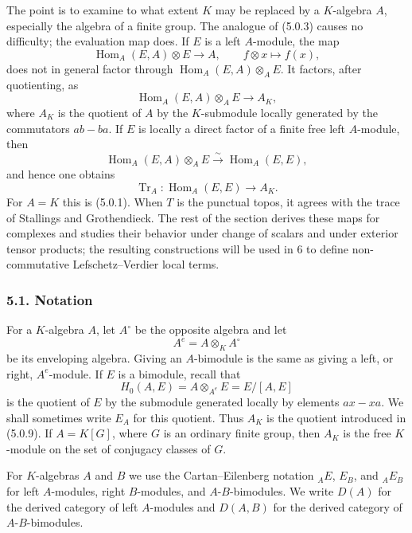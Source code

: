 \documentclass[12pt]{article}
\newcommand{\Hom}{\operatorname{Hom}}
\newcommand{\Tr}{\operatorname{Tr}}
\begin{document}
The point is to examine to what extent $K$ may be replaced by a $K$-algebra $A$, especially the algebra of a finite group. The analogue of (5.0.3) causes no difficulty; the evaluation map does. If $E$ is a left $A$-module, the map
\[
   \Hom_A(E,A)\otimes E\to A,
   \qquad f\otimes x\mapsto f(x),
\]
does not in general factor through $\Hom_A(E,A)\otimes_AE$. It factors, after quotienting, as
\begin{equation}
   \Hom_A(E,A)\otimes_AE\to A_K,                                  \tag{5.0.9}
\end{equation}
where $A_K$ is the quotient of $A$ by the $K$-submodule locally generated by the commutators $ab-ba$. If $E$ is locally a direct factor of a finite free left $A$-module, then
\begin{equation}
   \Hom_A(E,A)\otimes_AE\xrightarrow{\sim}\Hom_A(E,E),              \tag{5.0.10}
\end{equation}
and hence one obtains
\begin{equation}
   \Tr_A:\Hom_A(E,E)\to A_K.                                      \tag{5.0.11}
\end{equation}
For $A=K$ this is (5.0.1). When $T$ is the punctual topos, it agrees with the trace of Stallings and Grothendieck. The rest of the section derives these maps for complexes and studies their behavior under change of scalars and under exterior tensor products; the resulting constructions will be used in 6 to define non-commutative Lefschetz--Verdier local terms.

\subsubsection*{5.1. Notation}
For a $K$-algebra $A$, let $A^{\circ}$ be the opposite algebra and let
\[
   A^e=A\otimes_KA^{\circ}
\]
be its enveloping algebra. Giving an $A$-bimodule is the same as giving a left, or right, $A^e$-module. If $E$ is a bimodule, recall that
\[
   H_0(A,E)=A\otimes_{A^e}E=E/[A,E]
\]
is the quotient of $E$ by the submodule generated locally by elements $ax-xa$. We shall sometimes write $E_A$ for this quotient. Thus $A_K$ is the quotient introduced in (5.0.9). If $A=K[G]$, where $G$ is an ordinary finite group, then $A_K$ is the free $K$-module on the set of conjugacy classes of $G$.

For $K$-algebras $A$ and $B$ we use the Cartan--Eilenberg notation ${}_AE$, $E_B$, and ${}_AE_B$ for left $A$-modules, right $B$-modules, and $A$-$B$-bimodules. We write $D(A)$ for the derived category of left $A$-modules and $D(A,B)$ for the derived category of $A$-$B$-bimodules.
\end{document}
